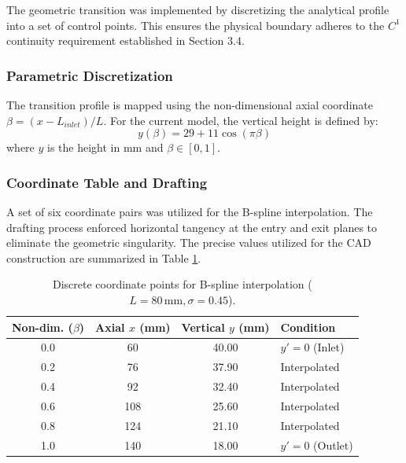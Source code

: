 \documentclass[12pt, a4paper]{article}
\begin{document}
The geometric transition was implemented by discretizing the analytical profile into a set of control points. This ensures the physical boundary adheres to the $C^1$ continuity requirement established in Section 3.4.

\subsubsection{Parametric Discretization}
The transition profile is mapped using the non-dimensional axial coordinate $\beta = (x - L_{inlet})/L$. For the current model, the vertical height is defined by:
\begin{equation}
	y(\beta) = 29 + 11 \cos(\pi \beta)
\end{equation}
where $y$ is the height in mm and $\beta \in [0, 1]$. 

\subsubsection{Coordinate Table and Drafting}
A set of six coordinate pairs was utilized for the B-spline interpolation. The drafting process enforced horizontal tangency at the entry and exit planes to eliminate the geometric singularity. The precise values utilized for the CAD construction are summarized in Table \ref{tab:interp_points}.

\begin{table}[H] %
	\centering
	\caption{Discrete coordinate points for B-spline interpolation ($L = 80\,\text{mm}, \sigma = 0.45$).}
	\label{tab:interp_points}
	\small %
	\begin{tabular}{c c c l} %
		\toprule
		\textbf{Non-dim. ($\beta$)} & \textbf{Axial $x$ (mm)} & \textbf{Vertical $y$ (mm)} & \textbf{Condition} \\
		\midrule
		0.0 & 60  & 40.00 & $y' = 0$ (Inlet) \\
		0.2 & 76  & 37.90 & Interpolated \\
		0.4 & 92  & 32.40 & Interpolated \\
		0.6 & 108 & 25.60 & Interpolated \\
		0.8 & 124 & 21.10 & Interpolated \\
		1.0 & 140 & 18.00 & $y' = 0$ (Outlet) \\
		\bottomrule
	\end{tabular}
\end{table}
\end{document}
